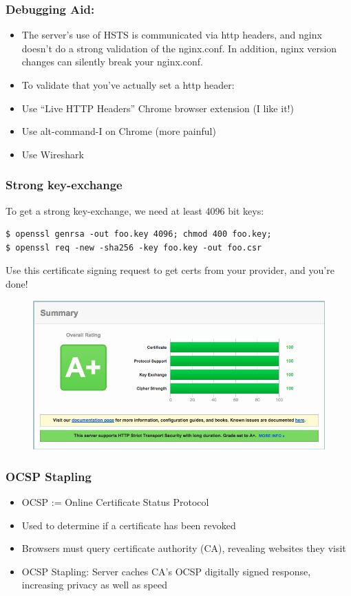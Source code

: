 \documentclass[9pt]{beamer}
\begin{document}
\begin{frame}[fragile]
\frametitle{Debugging Aid:}
\begin{itemize}
\item The server's use of HSTS is communicated via http headers, and nginx doesn't do a strong validation of the nginx.conf. In addition, nginx version changes can silently break your nginx.conf.
\pause
\item To validate that you've actually set a http header:
\pause
\item Use ``Live HTTP Headers'' Chrome browser extension (I like it!)
\pause 
\item Use alt-command-I on Chrome (more painful)
\pause 
\item Use Wireshark
\end{itemize}
\end{frame}

\begin{frame}[fragile]
\frametitle{Strong key-exchange}
To get a strong key-exchange, we need at least 4096 bit keys:
\pause
\begin{verbatim}
$ openssl genrsa -out foo.key 4096; chmod 400 foo.key;
$ openssl req -new -sha256 -key foo.key -out foo.csr
\end{verbatim}
\pause
Use this certificate signing request to get certs from your provider, and you're done!
\begin{figure}
\includegraphics[scale=0.25]{figures/App.png}
\end{figure}
\end{frame}

\begin{frame}[fragile]
\frametitle{OCSP Stapling}
\begin{itemize}
\item OCSP := Online Certificate Status Protocol
\pause
\item Used to determine if a certificate has been revoked
\pause
\item Browsers must query certificate authority (CA), revealing websites they visit
\pause
\item OCSP Stapling: Server caches CA's OCSP digitally signed response, increasing privacy as well as speed
\end{itemize}
\end{frame}
\end{document}
